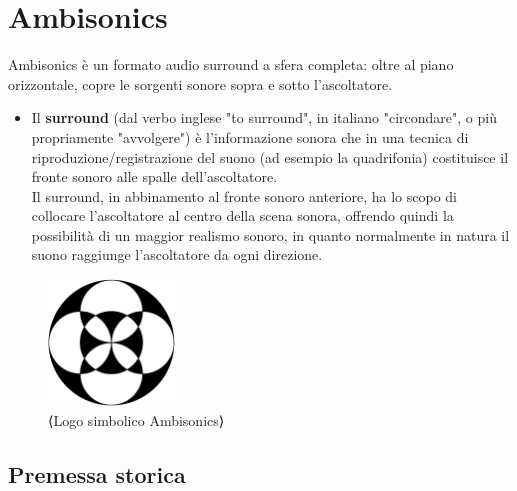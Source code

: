 

\chapter{Ambisonics}
\label{chp:Ambisonics}

Ambisonics è un formato audio surround a sfera completa: oltre al piano orizzontale, copre le sorgenti sonore sopra e sotto l'ascoltatore.
\begin{itemize}
\item Il \textbf{surround} (dal verbo inglese "to surround", in italiano "circondare", o più propriamente "avvolgere") è l'informazione sonora che in una tecnica di riproduzione/registrazione del suono (ad esempio la quadrifonia) costituisce il fronte sonoro alle spalle dell'ascoltatore.\\ Il surround, in abbinamento al fronte sonoro anteriore, ha lo scopo di collocare l'ascoltatore al centro della scena sonora, offrendo quindi la possibilità di un maggior realismo sonoro, in quanto normalmente in natura il suono raggiunge l'ascoltatore da ogni direzione.\\
\end{itemize}

\begin{figure}[h]
      \centering
      \includegraphics[width=0.3\textwidth]{Graphics/AmbisonicLogo.png}
      \caption{⟨Logo simbolico Ambisonics⟩}
      \label{fig:⟨etichetta⟩}
      \end{figure}

\section{Premessa storica}

